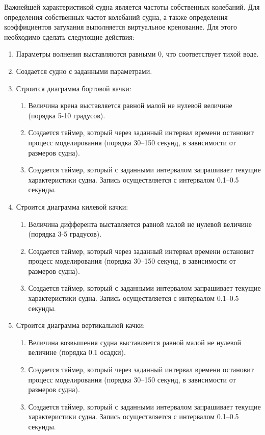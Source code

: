 Важнейшей характеристикой судна является частоты собственных колебаний.
Для определения собственных частот колебаний судна, а также определения коэффициентов затухания 
выполняется виртуальное кренование. Для этого необходимо сделать следующие действия:
\begin{enumerate}
	\item	Параметры волнения выставляются равными 0, что соответствует тихой воде.
	\item	Создается судно с заданными параметрами.
	\item	Строится диаграмма бортовой качки:
	\begin{enumerate}
	\item	Величина крена выставляется равной малой не нулевой величине (порядка 5-10 градусов).
	\item	Создается таймер, который через заданный интервал времени остановит процесс
			моделирования (порядка 30--150 секунд, в зависимости от размеров судна).
	\item	Создается таймер, который с заданными интервалом запрашивает текущие 
			характеристики судна. Запись осуществляется с интервалом 0.1--0.5 секунды.
	\end{enumerate}
			
	\item	Строится диаграмма килевой качки:
	\begin{enumerate}
	\item	Величина дифферента выставляется равной малой не нулевой величине (порядка 3-5 градусов).
	\item	Создается таймер, который через заданный интервал времени остановит процесс
			моделирования (порядка 30--150 секунд, в зависимости от размеров судна).
	\item	Создается таймер, который с заданными интервалом запрашивает текущие 
			характеристики судна. Запись осуществляется с интервалом 0.1--0.5 секунды.
	\end{enumerate}
			
	\item	Строится диаграмма вертикальной качки:
	\begin{enumerate}
	\item	Величина возвышения судна выставляется равной малой не нулевой величине (порядка 0.1 осадки).
	\item	Создается таймер, который через заданный интервал времени остановит процесс
			моделирования (порядка 30--150 секунд, в зависимости от размеров судна).
	\item	Создается таймер, который с заданными интервалом запрашивает текущие 
			характеристики судна. Запись осуществляется с интервалом 0.1--0.5 секунды.
	\end{enumerate}
\end{enumerate}


